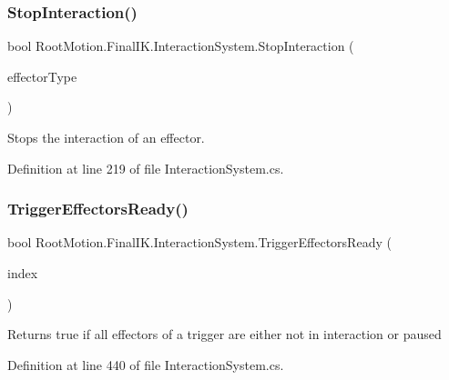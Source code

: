 \subsubsection{\texorpdfstring{Stop\+Interaction()}{StopInteraction()}}
{\footnotesize\ttfamily bool Root\+Motion.\+Final\+I\+K.\+Interaction\+System.\+Stop\+Interaction (\begin{DoxyParamCaption}\item[{\mbox{\hyperlink{namespace_root_motion_1_1_final_i_k_ae0dd2058c7667b6f132c11a6b860c14a}{Full\+Body\+Biped\+Effector}}}]{effector\+Type }\end{DoxyParamCaption})}



Stops the interaction of an effector. 



Definition at line 219 of file Interaction\+System.\+cs.

\mbox{\label{class_root_motion_1_1_final_i_k_1_1_interaction_system_a0f01fb429433d58907497e1202faf52b}} 
\subsubsection{\texorpdfstring{Trigger\+Effectors\+Ready()}{TriggerEffectorsReady()}}
{\footnotesize\ttfamily bool Root\+Motion.\+Final\+I\+K.\+Interaction\+System.\+Trigger\+Effectors\+Ready (\begin{DoxyParamCaption}\item[{int}]{index }\end{DoxyParamCaption})}



Returns true if all effectors of a trigger are either not in interaction or paused 



Definition at line 440 of file Interaction\+System.\+cs.

\mbox{\label{class_root_motion_1_1_final_i_k_1_1_interaction_system_a652cbce893d957ae9604d8ef8a99fe90}} 
